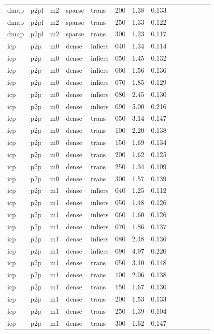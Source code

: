 \begin{table}[htbp]
\begin{tabular}{llllllrrrrrrrr}
  dmap & p2pl & m2 & sparse & trans & 200 & 1.38 & 0.133 \\
  dmap & p2pl & m2 & sparse & trans & 250 & 1.33 & 0.122 \\
  dmap & p2pl & m2 & sparse & trans & 300 & 1.23 & 0.117 \\
  icp & p2p & m0 & dense & inliers & 040 & 1.34 & 0.114 \\
  icp & p2p & m0 & dense & inliers & 050 & 1.45 & 0.132 \\
  icp & p2p & m0 & dense & inliers & 060 & 1.56 & 0.136 \\
  icp & p2p & m0 & dense & inliers & 070 & 1.85 & 0.129 \\
  icp & p2p & m0 & dense & inliers & 080 & 2.45 & 0.130 \\
  icp & p2p & m0 & dense & inliers & 090 & 5.00 & 0.216 \\
  icp & p2p & m0 & dense & trans & 050 & 3.14 & 0.147 \\
  icp & p2p & m0 & dense & trans & 100 & 2.20 & 0.138 \\
  icp & p2p & m0 & dense & trans & 150 & 1.69 & 0.134 \\
  icp & p2p & m0 & dense & trans & 200 & 1.62 & 0.125 \\
  icp & p2p & m0 & dense & trans & 250 & 1.34 & 0.109 \\
  icp & p2p & m0 & dense & trans & 300 & 1.57 & 0.139 \\
  icp & p2p & m1 & dense & inliers & 040 & 1.25 & 0.112 \\
  icp & p2p & m1 & dense & inliers & 050 & 1.48 & 0.126 \\
  icp & p2p & m1 & dense & inliers & 060 & 1.60 & 0.126 \\
  icp & p2p & m1 & dense & inliers & 070 & 1.86 & 0.137 \\
  icp & p2p & m1 & dense & inliers & 080 & 2.48 & 0.136 \\
  icp & p2p & m1 & dense & inliers & 090 & 4.97 & 0.220 \\
  icp & p2p & m1 & dense & trans & 050 & 3.10 & 0.148 \\
  icp & p2p & m1 & dense & trans & 100 & 2.06 & 0.138 \\
  icp & p2p & m1 & dense & trans & 150 & 1.67 & 0.130 \\
  icp & p2p & m1 & dense & trans & 200 & 1.53 & 0.133 \\
  icp & p2p & m1 & dense & trans & 250 & 1.39 & 0.104 \\
  icp & p2p & m1 & dense & trans & 300 & 1.62 & 0.147 \\

\end{tabular}
\end{table}
